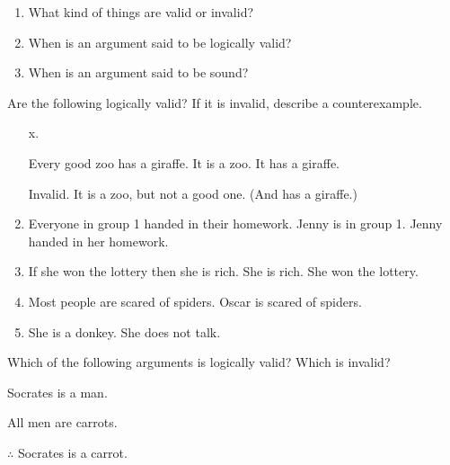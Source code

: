 \begin{practiceproblems}
\problempart
\begin{enumerate}
\item What kind of things are valid or invalid?
\item When is an argument said to be logically valid?
\item When is an argument said to be sound?
\end{enumerate}

\problempart
Are the following logically valid? If it is invalid, describe a counterexample.
\begin{enumerate}
\item[x.]
\begin{earg}
\prem Every good zoo has a giraffe.
\prem It is a zoo.
\conc It has a giraffe.
\end{earg}
\prem Invalid. It is a zoo, but not a good one. (And has a giraffe.)
\item
\begin{earg}
\prem Everyone in group 1 handed in their homework.
\prem Jenny is in group 1.
\conc Jenny handed in her homework.
\end{earg}
\item
\begin{earg}
\prem If she won the lottery then she is rich.
\prem She is rich.
\conc She won the lottery.
\end{earg}
\item
\begin{earg}
\prem Most people are scared of spiders.
\conc Oscar is scared of spiders.
\end{earg}
\item
\begin{earg}
\prem She is a donkey.
\conc She does not talk.
\end{earg}
\end{enumerate}


\problempart
Which of the following arguments is logically valid? Which is invalid?

\begin{earg}
\item Socrates is a man.
\item All men are carrots.
\item[$\therefore$]  Socrates is a carrot. \hfill {}
\end{earg}


\end{practiceproblems}
